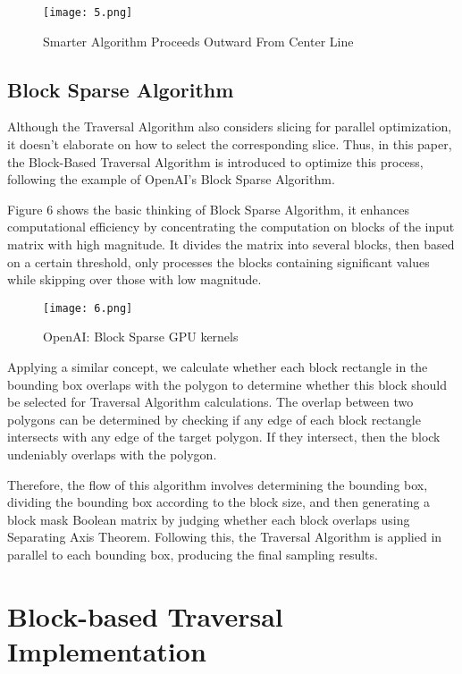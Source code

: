 \documentclass[
	a4paper, %
	10pt, %
	unnumberedsections, %
	twoside, %
]{LTJournalArticle}
\begin{document}
\begin{figure}[H] %
	\texttt{[image: 5.png]}
	\caption{Smarter Algorithm Proceeds Outward From Center Line}
\end{figure}

\subsection{Block Sparse Algorithm}
Although the Traversal Algorithm also considers slicing for parallel optimization, it doesn't elaborate on how to select the corresponding slice. Thus, in this paper, the Block-Based Traversal Algorithm is introduced to optimize this process, following the example of OpenAI's Block Sparse Algorithm.

Figure 6 shows the basic thinking of Block Sparse Algorithm, it enhances computational efficiency by concentrating the computation on blocks of the input matrix with high magnitude. It divides the matrix into several blocks, then based on a certain threshold, only processes the blocks containing significant values while skipping over those with low magnitude.\cite{gray2017}

\begin{figure}[H] %
	\texttt{[image: 6.png]}
	\caption{OpenAI: Block Sparse GPU kernels}
\end{figure}

Applying a similar concept, we calculate whether each block rectangle in the bounding box overlaps with the polygon to determine whether this block should be selected for Traversal Algorithm calculations. The overlap between two polygons can be determined by checking if any edge of each block rectangle intersects with any edge of the target polygon. If they intersect, then the block undeniably overlaps with the polygon.

Therefore, the flow of this algorithm involves determining the bounding box, dividing the bounding box according to the block size, and then generating a block mask Boolean matrix by judging whether each block overlaps using Separating Axis Theorem.\cite{gottschalk1996} Following this, the Traversal Algorithm is applied in parallel to each bounding box, producing the final sampling results.

\section{Block-based Traversal Implementation}
\end{document}
